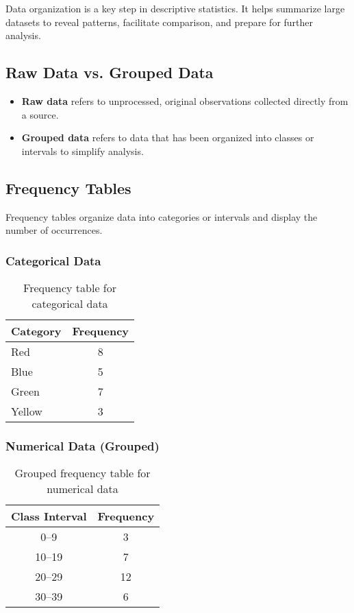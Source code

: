Data organization is a key step in descriptive statistics. It helps summarize large datasets to reveal patterns, facilitate comparison, and prepare for further analysis.

\subsection{Raw Data vs. Grouped Data}

\begin{itemize}
    \item \textbf{Raw data} refers to unprocessed, original observations collected directly from a source.
    \item \textbf{Grouped data} refers to data that has been organized into classes or intervals to simplify analysis.
\end{itemize}

\subsection{Frequency Tables}

Frequency tables organize data into categories or intervals and display the number of occurrences.

\subsubsection{Categorical Data}

\begin{table}[h!]
\centering
\begin{tabular}{|l|c|}
\hline
\textbf{Category} & \textbf{Frequency} \\
\hline
Red & 8 \\
Blue & 5 \\
Green & 7 \\
Yellow & 3 \\
\hline
\end{tabular}
\caption{Frequency table for categorical data}
\end{table}

\subsubsection{Numerical Data (Grouped)}

\begin{table}[!h]
\centering
\begin{tabular}{|c|c|}
\hline
\textbf{Class Interval} & \textbf{Frequency} \\
\hline
0–9   & 3 \\
10–19 & 7 \\
20–29 & 12 \\
30–39 & 6 \\
\hline
\end{tabular}
\caption{Grouped frequency table for numerical data}
\end{table}

